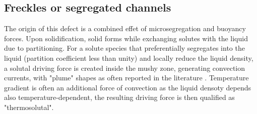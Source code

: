 \subsection*{Freckles or segregated channels} 
%
The origin of this defect is a combined effet of microsegregation and buoyancy forces. 
Upon solidification, solid forms while exchanging solutes with the liquid due to partitioning.
For a solute species that preferentially segregates into the liquid (partition coefficient less than unity)
and locally reduce the liquid density, a solutal driving force is created inside the mushy zone, generating convection currents, 
with "plume" shapes as often reported in the literature \citep{sarazin_studies_1992, schneider_modeling_1997,
shevchenko_chimney_2013}. Temperature gradient is often an additional force of convection as the liquid densoty depends also temperature-dependent, 
the resulting driving force is then qualified as "thermosolutal".
%
%
%
%

